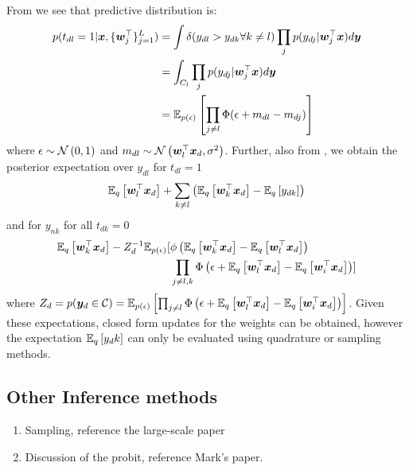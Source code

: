 From \cite{Girolami2007} we see that predictive distribution is:
\begin{equation}
\begin{aligned}
p(t_{dl} = 1 | \vv{x}, \{ \vv{w}_j\T \}_{j=1}^L) & =
\int \delta (y_{dl} > y_{dk} \forall k \neq l) \prod_j p(y_{dj} | \vv{w}_j\T\vv{x}) d\vv{y} \\
&= \int_{C_l} \prod_j p(y_{dj} | \vv{w}_j\T\vv{x}) d\vv{y} \\
&= \ex{\prod_{j \neq l} \Phi(\epsilon + m_{dl} - m_{dj})}{p(\epsilon)}
\end{aligned}
\end{equation}
where $\epsilon \sim \nor{0}{1}$ and $m_{dl} \sim \nor{\vv{w}_l\T\vv{x}_d}{\sigma^2}$. Further, also from \cite{Girolami2007}, we obtain the posterior expectation over $y_{dl}$ for $t_{dl} = 1$
\begin{align}
\ex{\vv{w}_l\T\vv{x}_d}{q} + \sum_{k \neq l} \left(\ex{\vv{w}_k\T\vv{x}_d}{q} - \ex{y_{dk}}{q}\right)
\end{align}
and for $y_{nk}$ for all $t_{dk} = 0$
\begin{align}
\begin{split}
\ex{\vv{w}_k\T\vv{x}_d}{q}
 - Z_d^{-1}\mathbb{E}_{p(\epsilon)} [ & \phi\left(\ex{\vv{w}_k\T\vv{x}_d}{q} - \ex{\vv{w}_l\T\vv{x}_d}{q} \right) \\
 & \prod_{j \neq l,k}\Phi\left(\epsilon + \ex{\vv{w}_l\T\vv{x}_d}{q} - \ex{\vv{w}_i\T\vv{x}_d}{q} \right) ]
\end{split}
\end{align}
where $Z_d = p(\vv{y}_d \in \mathcal{C}) = \ex{\prod_{j \neq l}\Phi\left(\epsilon + \ex{\vv{w}_l\T\vv{x}_d}{q} - \ex{\vv{w}_i\T\vv{x}_d}{q} \right) }{p(\epsilon)}$. Given these expectations, closed form updates for the weights can be obtained, however the expectation $\ex{y_dk}{q}$ can only be evaluated using quadrature or sampling methods.


\subsection{Other Inference methods}
\begin{enumerate}
    \item Sampling, reference the large-scale paper
    \item Discussion of the probit, reference Mark's paper.
\end{enumerate}



